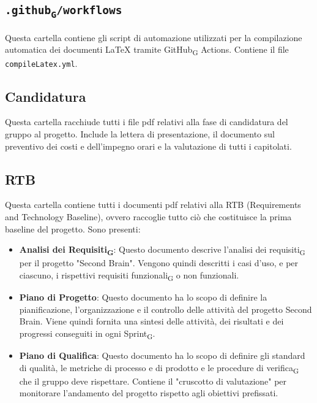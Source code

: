 \documentclass[11pt,a4paper]{article}
\newcommand{\gls}[1]{#1\textsubscript{G}}
\begin{document}
\subsection{\texttt{.\gls{github}/workflows}}
Questa cartella contiene gli script di automazione utilizzati per la compilazione automatica dei documenti LaTeX tramite \gls{GitHub} Actions. 
Contiene il file \texttt{compileLatex.yml}.

\subsection{Candidatura}
Questa cartella racchiude tutti i file pdf relativi alla fase di candidatura del gruppo al progetto. Include la lettera di presentazione, il documento sul preventivo dei costi e dell'impegno orari e la valutazione di tutti i capitolati.

\subsection{RTB}
Questa cartella contiene tutti i documenti pdf relativi alla RTB (Requirements and Technology Baseline), ovvero raccoglie tutto ciò che costituisce la prima baseline del progetto. Sono presenti:
\begin{itemize}
    \item \textbf{\gls{Analisi dei Requisiti}}: Questo documento descrive l'\gls{analisi dei requisiti} per il progetto "Second Brain". Vengono quindi descritti i casi d'uso, e per ciascuno, i rispettivi \gls{requisiti funzionali} o non funzionali.
    
    \item \textbf{Piano di Progetto}: Questo documento ha lo scopo di definire la pianificazione, l’organizzazione e il controllo delle attività del progetto Second Brain. Viene quindi fornita una sintesi delle attività, dei risultati e dei progressi conseguiti in ogni \gls{Sprint}.
    
    \item \textbf{Piano di Qualifica}: Questo documento ha lo scopo di definire gli standard di qualità, le metriche di processo e di prodotto e le procedure di \gls{verifica} che il gruppo deve rispettare. Contiene il "cruscotto di valutazione" per monitorare l'andamento del progetto rispetto agli obiettivi prefissati.
\end{itemize}
\end{document}
